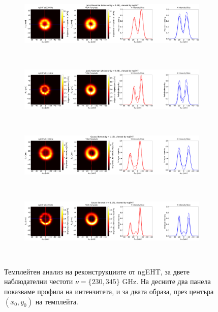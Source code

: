 \begin{figure}[h!]
	\centering
	\begin{subfigure}{12cm}
		\hspace{-1.5cm}
		\includegraphics[scale = 0.13]{Ehtim_Vida_plot_ngEHT_230_JNW.png}
	\end{subfigure}\\
	\begin{subfigure}{12cm}
		\hspace{-1.5cm}
		\includegraphics[scale = 0.13]{Ehtim_Vida_plot_ngEHT_345_JNW.png}
	\end{subfigure}\\
	\begin{subfigure}{12cm}
		\hspace{-1.5cm}
		\includegraphics[scale = 0.13]{Ehtim_Vida_plot_ngEHT_230_GB.png}
	\end{subfigure}\\
	\begin{subfigure}{12cm}
		\hspace{-1.5cm}
		\includegraphics[scale = 0.13]{Ehtim_Vida_plot_ngEHT_345_GB.png}
	\end{subfigure}\\
	\label{VIDA_ngEHT_230}
	\caption[Темплейтен анализ на реконструкциите от ngEHT]{\small Темплейтен анализ на реконструкциите от ngEHT, за двете наблюдателни честоти $\nu = \{230, 345\}$ GHz. На десните два панела показваме профила на интензитета, и за двата образа, през центъра $(x_0,y_0)$ на темплейта.} 
\end{figure}

